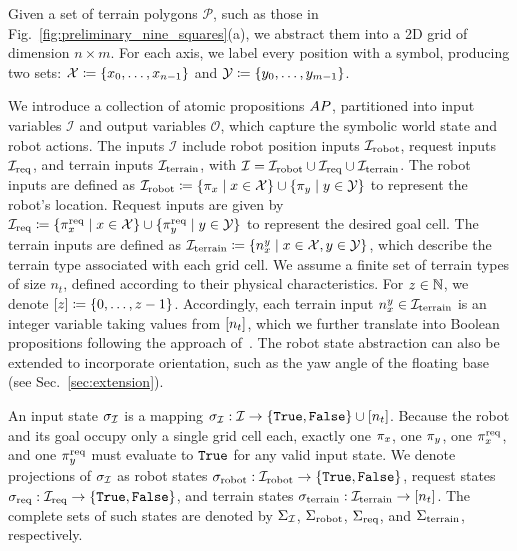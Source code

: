 Given a set of terrain polygons $\mathcal{P}$, such as those in Fig.~\ref{fig:preliminary_nine_squares}(a), we abstract them into a 2D grid of dimension $n \times m$. For each axis, we label every position with a symbol, producing two sets: ${\mathcal X} \coloneqq \{x_0, \dots, x_{n-1}\}$ and ${\mathcal Y} \coloneqq \{y_0, \dots, y_{m-1}\}$.

We introduce a collection of atomic propositions $AP$, partitioned into input variables $\mathcal{I}$ and output variables $\mathcal{O}$, which capture the symbolic world state and robot actions. The inputs $\mathcal{I}$ include robot position inputs ${\mathcal I}_{\textrm{robot}}$, request inputs ${\mathcal I}_{\textrm{req}}$, and terrain inputs ${\mathcal I}_{\textrm{terrain}}$, with ${\mathcal I} = {\mathcal I}_{\textrm{robot}} \cup {\mathcal I}_{\textrm{req}} \cup {\mathcal I}_{\textrm{terrain}}$.
The robot inputs are defined as ${\mathcal I}_{\textrm{robot}} \coloneqq \{\pi_x \mid x \in {\mathcal X}\} \cup \{\pi_y \mid y \in {\mathcal Y}\}$ to represent the robot’s location. Request inputs are given by ${\mathcal I}_{\textrm{req}} \coloneqq \{\pi_x^\textrm{req} \mid x \in {\mathcal X}\} \cup \{\pi_y^\textrm{req} \mid y \in {\mathcal Y}\}$ to represent the desired goal cell. The terrain inputs are defined as ${\mathcal I}_{\textrm{terrain}} \coloneqq \{n_{x}^{y} \mid x \in {\mathcal X}, y \in {\mathcal Y}\}$, which describe the terrain type associated with each grid cell.
We assume a finite set of terrain types of size $n_t$, defined according to their physical characteristics. For $z \in \mathbb{N}$, we denote $[z] \coloneqq \{0, \dots, z - 1\}$. Accordingly, each terrain input $n_{x}^{y} \in {\mathcal I}_{\textrm{terrain}}$ is an integer variable taking values from $[n_t]$, which we further translate into Boolean propositions following the approach of~\citep{ehlers2016slugs}. The robot state abstraction can also be extended to incorporate orientation, such as the yaw angle of the floating base (see Sec.~\ref{sec:extension}).

An input state $\sigma_{\mathcal I}$ is a mapping $\sigma_{\mathcal I}: {\mathcal I} \to \{{\tt{True}}, {\tt{False}}\} \cup [n_t]$. Because the robot and its goal occupy only a single grid cell each, exactly one $\pi_x$, one $\pi_y$, one $\pi_x^\textrm{req}$, and one $\pi_y^\textrm{req}$ must evaluate to ${\tt{True}}$ for any valid input state. We denote projections of $\sigma_{\mathcal I}$ as robot states $\sigma_{\textrm{robot}}: {\mathcal I}_{\textrm{robot}} \to \{{\tt{True}}, {\tt{False}}\}$, request states $\sigma_{\textrm{req}}: {\mathcal I}_{\textrm{req}} \to \{{\tt{True}}, {\tt{False}}\}$, and terrain states $\sigma_{\textrm{terrain}}: {\mathcal I}_{\textrm{terrain}} \to [n_t]$. The complete sets of such states are denoted by $\Sigma_{\mathcal I}$, $\Sigma_{\textrm{robot}}$, $\Sigma_{\textrm{req}}$, and $\Sigma_{\textrm{terrain}}$, respectively.


